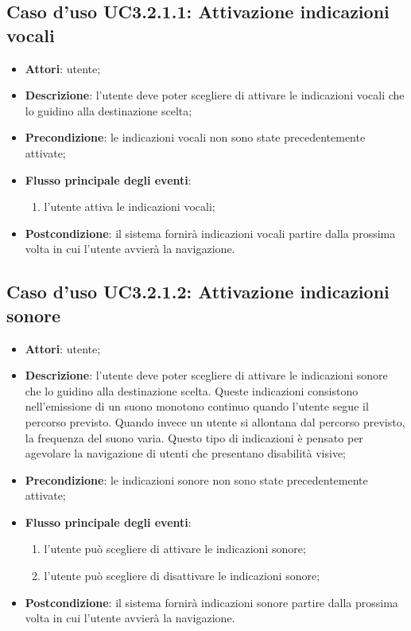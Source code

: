 \documentclass[../AnalisiDeiRequisiti.tex]{subfiles}
\begin{document}
\subsection{Caso d'uso UC3.2.1.1: Attivazione indicazioni vocali}
\begin{itemize}
	\item \textbf{Attori}: utente;
	\item \textbf{Descrizione}: l'utente deve poter scegliere di attivare le indicazioni vocali che lo guidino alla destinazione scelta; 
	\item \textbf{Precondizione}: le indicazioni vocali non sono state precedentemente attivate;
	
	\item \textbf{Flusso principale degli eventi}:
	\begin{enumerate}
		\item l'utente attiva le indicazioni vocali;
		
	\end{enumerate}
	\item \textbf{Postcondizione}: il sistema fornirà indicazioni vocali partire dalla prossima volta in cui l'utente avvierà la navigazione.
\end{itemize}
\hypertarget{UC3.2.1.2}{}
\subsection{Caso d'uso UC3.2.1.2: Attivazione indicazioni sonore}
\begin{itemize}
	\item \textbf{Attori}: utente;
	\item \textbf{Descrizione}: l'utente deve poter scegliere di attivare le indicazioni sonore che lo guidino alla destinazione scelta. Queste indicazioni consistono nell'emissione di un suono monotono continuo quando l'utente segue il percorso previsto. Quando invece un utente si allontana dal percorso previsto, la frequenza del suono varia. Questo tipo di indicazioni è pensato per agevolare la navigazione di utenti che presentano disabilità visive; 
	\item \textbf{Precondizione}: le indicazioni sonore non sono state precedentemente attivate;
	
	\item \textbf{Flusso principale degli eventi}:
	\begin{enumerate}
		\item l'utente può scegliere di attivare le indicazioni sonore;
		\item l'utente può scegliere di disattivare le indicazioni sonore;
		
	\end{enumerate}
	\item \textbf{Postcondizione}: il sistema fornirà indicazioni sonore partire dalla prossima volta in cui l'utente avvierà la navigazione.
\end{itemize}
\hypertarget{UC3.2.1.3}{}
\end{document}
